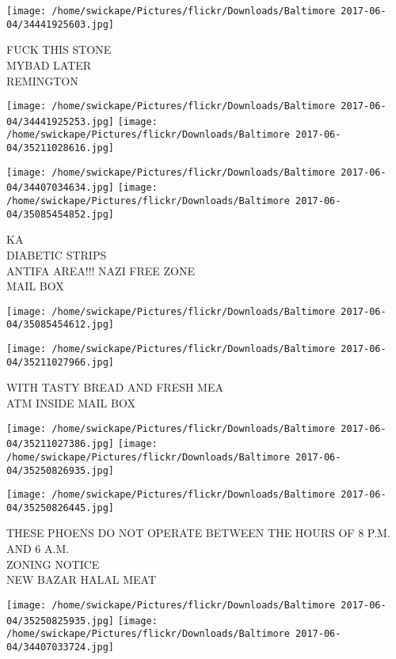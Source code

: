 \documentclass[10pt,letterpaper]{article}
\begin{document}
\vspace{0.25in}
\texttt{[image: /home/swickape/Pictures/flickr/Downloads/Baltimore 2017-06-04/34441925603.jpg]}

FUCK THIS STONE\\
MYBAD LATER\\
REMINGTON\\
\pagebreak

\texttt{[image: /home/swickape/Pictures/flickr/Downloads/Baltimore 2017-06-04/34441925253.jpg]}
\texttt{[image: /home/swickape/Pictures/flickr/Downloads/Baltimore 2017-06-04/35211028616.jpg]}

\texttt{[image: /home/swickape/Pictures/flickr/Downloads/Baltimore 2017-06-04/34407034634.jpg]}
\texttt{[image: /home/swickape/Pictures/flickr/Downloads/Baltimore 2017-06-04/35085454852.jpg]}

KA\\
DIABETIC STRIPS\\
ANTIFA AREA!!! NAZI FREE ZONE\\
MAIL BOX\\
\pagebreak

\texttt{[image: /home/swickape/Pictures/flickr/Downloads/Baltimore 2017-06-04/35085454612.jpg]}

\vspace{0.25in}
\texttt{[image: /home/swickape/Pictures/flickr/Downloads/Baltimore 2017-06-04/35211027966.jpg]}

WITH TASTY BREAD AND FRESH MEA\\
ATM INSIDE MAIL BOX\\
\pagebreak

\texttt{[image: /home/swickape/Pictures/flickr/Downloads/Baltimore 2017-06-04/35211027386.jpg]}
\texttt{[image: /home/swickape/Pictures/flickr/Downloads/Baltimore 2017-06-04/35250826935.jpg]}

\vspace{0.25in}
\texttt{[image: /home/swickape/Pictures/flickr/Downloads/Baltimore 2017-06-04/35250826445.jpg]}

THESE PHOENS DO NOT OPERATE BETWEEN THE HOURS OF 8 P.M. AND 6 A.M.\\
ZONING NOTICE\\
NEW BAZAR HALAL MEAT\\
\pagebreak

\texttt{[image: /home/swickape/Pictures/flickr/Downloads/Baltimore 2017-06-04/35250825935.jpg]}
\texttt{[image: /home/swickape/Pictures/flickr/Downloads/Baltimore 2017-06-04/34407033724.jpg]}
\end{document}
